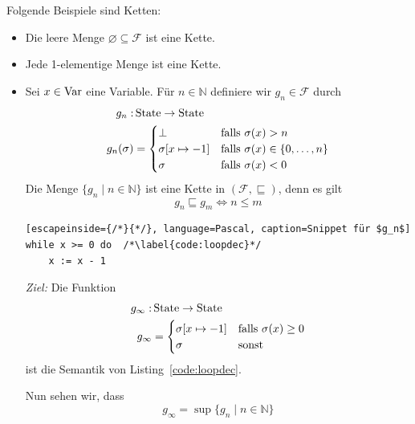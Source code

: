 \begin{example}
    Folgende Beispiele sind Ketten:
    \begin{itemize}
        \item Die leere Menge $\varnothing \subseteq \mathcal{F}$ ist eine Kette.
        \item Jede 1-elementige Menge ist eine Kette.
        \item Sei $x \in \operatorname{Var}$ eine Variable. Für $n \in \mathbb{N}$ definiere wir $g_n \in \mathcal{F}$ durch \begin{align*}
                g_n: & \operatorname{State} \to \operatorname{State} \\
                g_n(\sigma) & = \begin{cases}
                    \bot & \text{falls } \sigma(x) > n \\
                    \sigma[x \mapsto -1] & \text{falls } \sigma(x) \in \{ 0, \dots, n \} \\
                    \sigma & \text{falls } \sigma(x) < 0
                \end{cases}
            \end{align*}
            Die Menge $\{ g_n \mid n \in \mathbb{N} \}$ ist eine Kette in $(\mathcal{F}, \sqsubseteq)$, denn es gilt \[
                    g_n \sqsubseteq g_m \Leftrightarrow n \leq m
                \]
\begin{lstlisting}[escapeinside={/*}{*/}, language=Pascal, caption=Snippet für $g_n$]
while x >= 0 do  /*\label{code:loopdec}*/
    x := x - 1
\end{lstlisting}
            \emph{Ziel:} Die Funktion \begin{align*}
                g_{\infty}: & \operatorname{State} \to \operatorname{State} \\
                g_{\infty} & = \begin{cases}
                    \sigma[x \mapsto -1] & \text{falls } \sigma(x) \geq 0 \\
                    \sigma & \text{sonst}
                \end{cases}
            \end{align*}
            ist die Semantik von Listing~\ref{code:loopdec}.

            Nun sehen wir, dass \[
                g_{\infty} = \sup \{ g_n \mid n \in \mathbb{N} \}
            \]
    \end{itemize}
\end{example}

